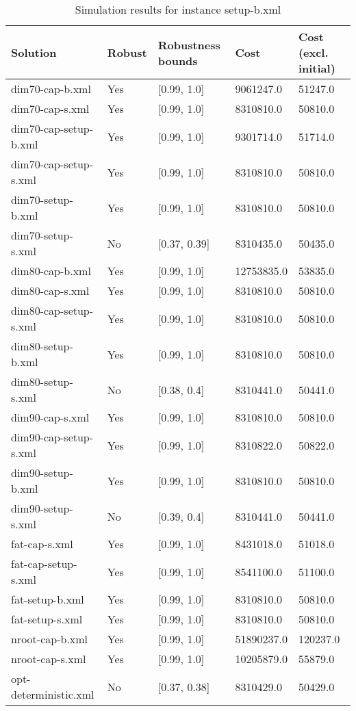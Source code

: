 \begin{table}[!hbp]
\label{tab:instance6_results}
\begin{tabular}{lllll}
\hline
Solution 	& Robust  	& Robustness bounds 	& Cost 	& Cost (excl. initial) \\
\hline
\hline
dim70-cap-b.xml 	& Yes 	&  [0.99, 1.0] 	& 9061247.0 	& 51247.0\\
dim70-cap-s.xml 	& Yes 	&  [0.99, 1.0] 	& 8310810.0 	& 50810.0\\
dim70-cap-setup-b.xml 	& Yes 	&  [0.99, 1.0] 	& 9301714.0 	& 51714.0\\
dim70-cap-setup-s.xml 	& Yes 	&  [0.99, 1.0] 	& 8310810.0 	& 50810.0\\
dim70-setup-b.xml 	& Yes 	&  [0.99, 1.0] 	& 8310810.0 	& 50810.0\\
dim70-setup-s.xml 	& No 	&  [0.37, 0.39] 	& 8310435.0 	& 50435.0\\
dim80-cap-b.xml 	& Yes 	&  [0.99, 1.0] 	& 12753835.0 	& 53835.0\\
dim80-cap-s.xml 	& Yes 	&  [0.99, 1.0] 	& 8310810.0 	& 50810.0\\
dim80-cap-setup-s.xml 	& Yes 	&  [0.99, 1.0] 	& 8310810.0 	& 50810.0\\
dim80-setup-b.xml 	& Yes 	&  [0.99, 1.0] 	& 8310810.0 	& 50810.0\\
dim80-setup-s.xml 	& No 	&  [0.38, 0.4] 	& 8310441.0 	& 50441.0\\
dim90-cap-s.xml 	& Yes 	&  [0.99, 1.0] 	& 8310810.0 	& 50810.0\\
dim90-cap-setup-s.xml 	& Yes 	&  [0.99, 1.0] 	& 8310822.0 	& 50822.0\\
dim90-setup-b.xml 	& Yes 	&  [0.99, 1.0] 	& 8310810.0 	& 50810.0\\
dim90-setup-s.xml 	& No 	&  [0.39, 0.4] 	& 8310441.0 	& 50441.0\\
fat-cap-s.xml 	& Yes 	&  [0.99, 1.0] 	& 8431018.0 	& 51018.0\\
fat-cap-setup-s.xml 	& Yes 	&  [0.99, 1.0] 	& 8541100.0 	& 51100.0\\
fat-setup-b.xml 	& Yes 	&  [0.99, 1.0] 	& 8310810.0 	& 50810.0\\
fat-setup-s.xml 	& Yes 	&  [0.99, 1.0] 	& 8310810.0 	& 50810.0\\
nroot-cap-b.xml 	& Yes 	&  [0.99, 1.0] 	& 51890237.0 	& 120237.0\\
nroot-cap-s.xml 	& Yes 	&  [0.99, 1.0] 	& 10205879.0 	& 55879.0\\
opt-deterministic.xml 	& No 	&  [0.37, 0.38] 	& 8310429.0 	& 50429.0\\
\hline
\end{tabular}
\caption{Simulation results for instance setup-b.xml}
\end{table}


